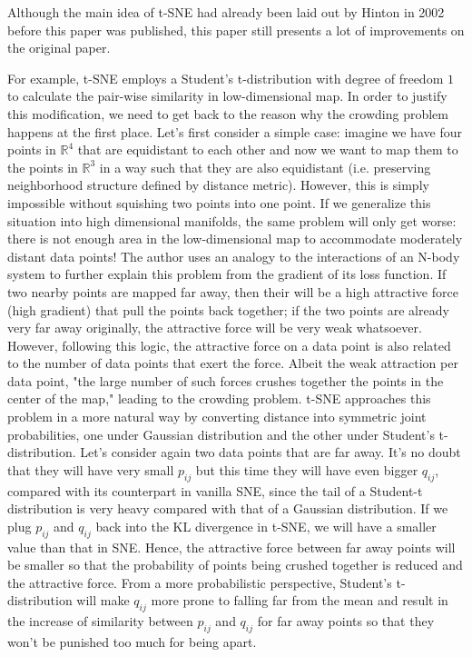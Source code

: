 \documentclass[letter,10pt]{article}
\begin{document}
Although the main idea of t-SNE had already been laid out by Hinton in 2002 before this paper was published, this paper still presents a lot of improvements on the original paper.

For example, t-SNE employs a Student's t-distribution with degree of freedom $1$ to calculate the pair-wise similarity in low-dimensional map. In order to justify this modification, we need to get back to the reason why the crowding problem happens at the first place. Let's first consider a simple case: imagine we have four points in $\mathbb{R}^4$ that are equidistant to each other and now we want to map them to the points in $\mathbb{R}^3$ in a way such that they are also equidistant (i.e. preserving neighborhood structure defined by distance metric). However, this is simply impossible without squishing two points into one point. If we generalize this situation into high dimensional manifolds, the same problem will only get worse: there is not enough area in the low-dimensional map to accommodate moderately distant data points! The author uses an analogy to the interactions of an N-body system to further explain this problem from the gradient of its loss function. If two nearby points are mapped far away, then their will be a high attractive force (high gradient) that pull the points back together; if the two points are already very far away originally, the attractive force will be very weak whatsoever. However, following this logic, the attractive force on a data point is also related to the number of data points that exert the force. Albeit the weak attraction per data point, "the large number of such forces crushes together the points in the center of the map," leading to the crowding problem. t-SNE approaches this problem in a more natural way by converting distance into symmetric joint probabilities, one under Gaussian distribution and the other under Student's t-distribution. Let's consider again two data points that are far away. It's no doubt that they will have very small $p_{ij}$ but this time they will have even bigger $q_{ij}$, compared with its counterpart in vanilla SNE, since the tail of a Student-t distribution is very heavy compared with that of a Gaussian distribution. If we plug $p_{ij}$ and $q_{ij}$ back into the KL divergence in t-SNE, we will have a smaller value than that in SNE. Hence, the attractive force between far away points will be smaller so that the probability of points being crushed together is reduced and the attractive force. From a more probabilistic perspective, Student's t-distribution will make $q_{ij}$ more prone to falling far from the mean and result in the increase of similarity between $p_{ij}$ and $q_{ij}$ for far away points so that they won't be punished too much for being apart.
\end{document}
